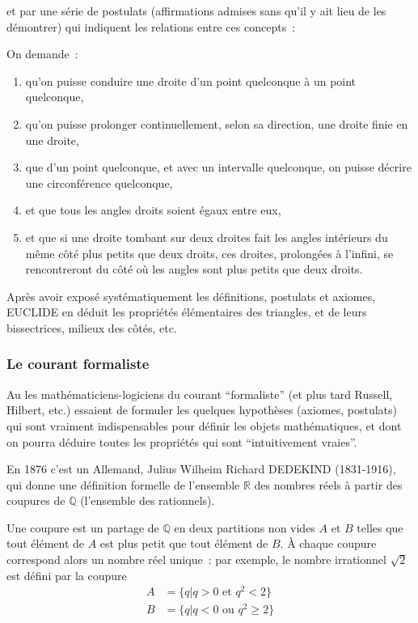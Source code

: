 et par une série de postulats (affirmations admises sans qu'il y ait
lieu de les démontrer) qui indiquent les relations entre ces concepts~:
\begin{citation}
On demande~:
\begin{enumerate}
\item qu'on puisse conduire une droite d'un point quelconque à un point quelconque,
	\item qu'on puisse prolonger continuellement, selon sa
	direction, une droite finie en une droite,
\item  que d'un point quelconque, et avec un intervalle quelconque, on puisse décrire une circonférence quelconque,
\item et que tous les angles droits soient égaux entre eux,
\item et que si une droite tombant sur deux droites fait les angles intérieurs du m\^eme c\^oté plus petits que deux droits, ces droites, prolongées à l'infini, se rencontreront du c\^oté o\`u les angles sont plus petits que deux droits.
\end{enumerate}
\end{citation}

Après avoir exposé systématiquement les définitions, postulats et
axiomes, EUCLIDE en déduit les propriétés élémentaires des triangles,
et de leurs bissectrices, milieux des c\^otés, etc.

\subsubsection*{Le courant formaliste}

Au  les mathématiciens-logiciens du courant ``formaliste'' (et
 plus tard Russell, Hilbert, etc.) essaient de formuler les quelques
 hypothèses (axiomes, postulats) qui sont vraiment indispensables pour
 définir les objets mathématiques, et dont on pourra déduire toutes
 les propriétés qui sont ``intuitivement vraies''.

En 1876 c'est un Allemand, Julius Wilheim Richard DEDEKIND
(1831-1916), qui donne une définition formelle de l'ensemble $\mathbb{R}$ des
nombres réels à partir des coupures de $\mathbb{Q}$ (l'ensemble des
rationnels).
\begin{citation}
Une coupure est un partage de $\mathbb{Q}$ en deux partitions non vides $A$ et $B$
telles que tout élément de $A$ est plus petit que tout élément de $B$. À
chaque coupure correspond alors un nombre réel unique~: par exemple,
le nombre irrationnel $\sqrt{2}$ est défini par la coupure 
$$\begin{array}{rl}
A &= \{ q | q>0 \mbox{\ et\ } q^2<2 \} \\
 B &= \{ q | q<0 \mbox{\ ou\ } q^2 \geq 2 \} 
\end{array}$$

\end{citation}

